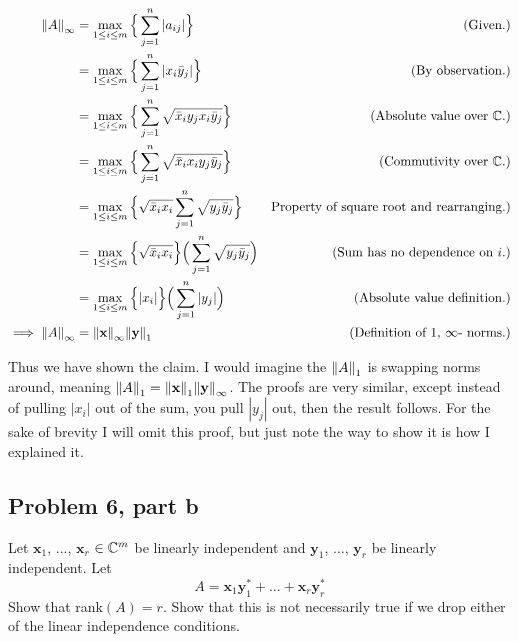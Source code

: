 \begin{solution}
    \newpage
    \alignbreak
    \begin{align}
        \norm{A}_\infty &= \max_{1 \leq i \leq m}\Big\{ \sum_{j = 1}^n |a_{ij}|\Big\} &\text{(Given.)}\nonumber\\
        &= \max_{1 \leq i \leq m}\Big\{ \sum_{j = 1}^n |x_i\Bar{y}_j|\Big\} &\text{(By observation.)}\nonumber\\
        &= \max_{1 \leq i \leq m}\Big\{ \sum_{j = 1}^n \sqrt{\Bar{x}_iy_jx_i\Bar{y}_j}\Big\} &\text{(Absolute value over $\mathbb{C}$.)}\nonumber\\
        &= \max_{1 \leq i \leq m}\Big\{ \sum_{j = 1}^n \sqrt{\Bar{x}_ix_iy_j\Bar{y}_j}\Big\} &\text{(Commutivity over $\mathbb{C}$.)}\nonumber\\
        &= \max_{1 \leq i \leq m}\Big\{ \sqrt{\Bar{x}_ix_i}\sum_{j = 1}^n \sqrt{y_j\Bar{y}_j}\Big\} &\text{Property of square root and rearranging.)}\nonumber\\
        &= \max_{1 \leq i \leq m}\Big\{ \sqrt{\Bar{x}_ix_i}\Big\} \Big(\sum_{j = 1}^n \sqrt{y_j\Bar{y}_j}\Big) &\text{(Sum has no dependence on $i$.)}\nonumber\\
        &= \max_{1 \leq i \leq m}\Big\{ |x_i|\Big\} \Big(\sum_{j = 1}^n |y_j|\Big) &\text{(Absolute value definition.)}\nonumber\\
        \implies \norm{A}_\infty &= \norm{\textbf{x}}_\infty \norm{\textbf{y}}_1 &\text{(Definition of $1$, $\infty$- norms.)}\nonumber
    \end{align}
    \alignbreak

    Thus we have shown the claim. I would imagine the $\norm{A}_1$ is swapping norms around, meaning $\norm{A}_1 = \norm{\textbf{x}}_1\norm{\textbf{y}}_\infty$. The proofs are very similar, except instead of pulling $|x_i|$ out of the sum, you pull $|y_j|$ out, then the result follows. For the sake of brevity I will omit this proof, but just note the way to show it is how I explained it.
\end{solution}

\newpage
\subsection{Problem 6, part b}
Let $\textbf{x}_1$, ..., $\textbf{x}_r$ $\in \mathbb{C}^m$ be linearly independent and $\textbf{y}_1$, ..., $\textbf{y}_r$ be linearly independent. Let 
\[
A = \textbf{x}_1\textbf{y}_1^* + ... + \textbf{x}_r\textbf{y}_r^*
\]
Show that rank$(A) = r$. Show that this is not necessarily true if we drop either of the linear independence conditions.
\partbreak

